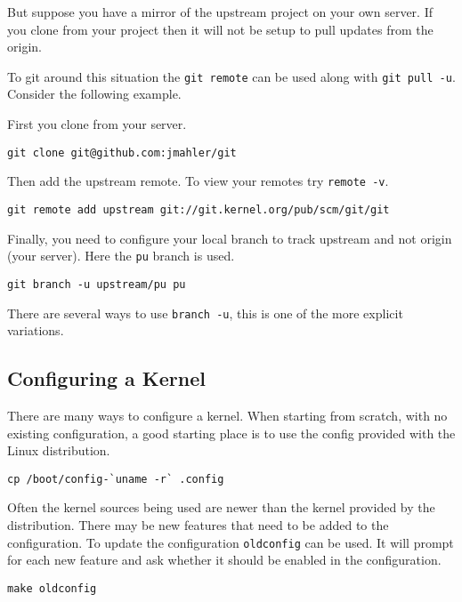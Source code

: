 \documentclass{article}
\begin{document}
But suppose you have a mirror of the upstream project on your own server.
If you clone from your project then it will not be setup to pull updates
from the origin.

To git around this situation the \verb+git remote+ can be used along with
\verb+git pull -u+.  Consider the following example.

First you clone from your server.

\begin{verbatim}
git clone git@github.com:jmahler/git
\end{verbatim}

Then add the upstream remote.  To view your remotes try \verb+remote -v+.

\begin{verbatim}
git remote add upstream git://git.kernel.org/pub/scm/git/git
\end{verbatim}

Finally, you need to configure your local branch to track upstream
and not origin (your server).  Here the \verb+pu+ branch is used.

\begin{verbatim}
git branch -u upstream/pu pu
\end{verbatim}

There are several ways to use \verb+branch -u+, this is one of the more explicit
variations.

\subsection{Configuring a Kernel}

There are many ways to configure a kernel.  When starting from scratch,
with no existing configuration, a good starting place is to use the
config provided with the Linux distribution.

\begin{verbatim}
cp /boot/config-`uname -r` .config
\end{verbatim}

Often the kernel sources being used are newer than the kernel provided
by the distribution.  There may be new features that need to be added to
the configuration.  To update the configuration \verb+oldconfig+ can be used.
It will prompt for each new feature and ask whether it should be enabled
in the configuration.

\begin{verbatim}
make oldconfig
\end{verbatim}
\end{document}
